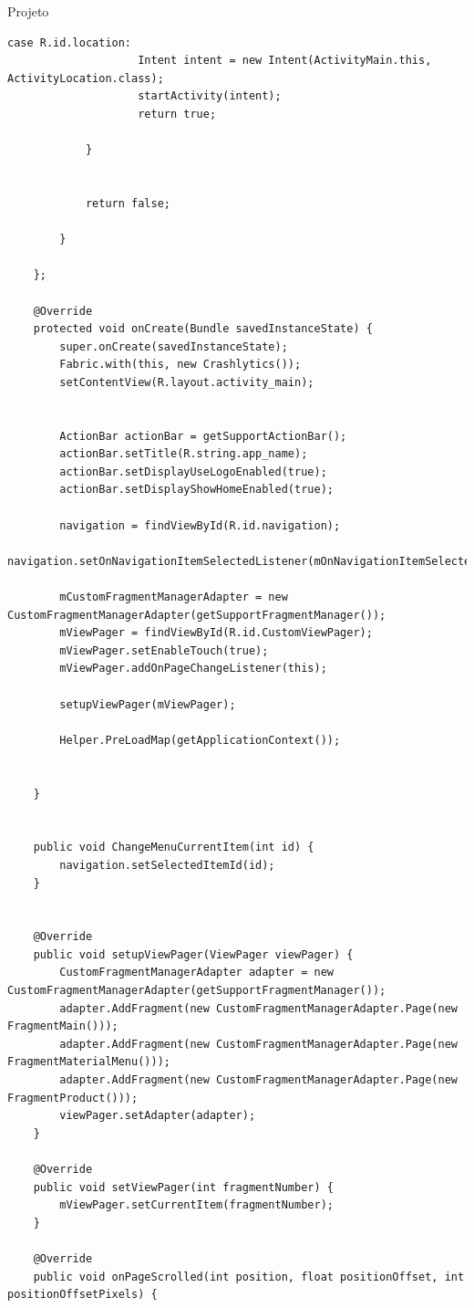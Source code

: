\documentclass[
	12pt,				%
	openright,			%
	twoside,			%
	a4paper,			%
	english,			%
	french,				%
	spanish,			%
	brazil				%
	]{abntex2}
\begin{document}
\begin{chapter}{Projeto}
\begin{lstlisting}[numbers=none,
basicstyle=\small,
caption={MainActivity.java},
title={MainActivity.java},
label={MainActivity.java}]
                case R.id.location:
                    Intent intent = new Intent(ActivityMain.this, ActivityLocation.class);
                    startActivity(intent);
                    return true;

            }


            return false;

        }

    };

    @Override
    protected void onCreate(Bundle savedInstanceState) {
        super.onCreate(savedInstanceState);
        Fabric.with(this, new Crashlytics());
        setContentView(R.layout.activity_main);


        ActionBar actionBar = getSupportActionBar();
        actionBar.setTitle(R.string.app_name);
        actionBar.setDisplayUseLogoEnabled(true);
        actionBar.setDisplayShowHomeEnabled(true);
      
        navigation = findViewById(R.id.navigation);
        navigation.setOnNavigationItemSelectedListener(mOnNavigationItemSelectedListener);

        mCustomFragmentManagerAdapter = new CustomFragmentManagerAdapter(getSupportFragmentManager());
        mViewPager = findViewById(R.id.CustomViewPager);
        mViewPager.setEnableTouch(true);
        mViewPager.addOnPageChangeListener(this);

        setupViewPager(mViewPager);

        Helper.PreLoadMap(getApplicationContext());


    }


    public void ChangeMenuCurrentItem(int id) {
        navigation.setSelectedItemId(id);
    }


    @Override
    public void setupViewPager(ViewPager viewPager) {
        CustomFragmentManagerAdapter adapter = new CustomFragmentManagerAdapter(getSupportFragmentManager());
        adapter.AddFragment(new CustomFragmentManagerAdapter.Page(new FragmentMain()));
        adapter.AddFragment(new CustomFragmentManagerAdapter.Page(new FragmentMaterialMenu()));
        adapter.AddFragment(new CustomFragmentManagerAdapter.Page(new FragmentProduct()));
        viewPager.setAdapter(adapter);
    }

    @Override
    public void setViewPager(int fragmentNumber) {
        mViewPager.setCurrentItem(fragmentNumber);
    }

    @Override
    public void onPageScrolled(int position, float positionOffset, int positionOffsetPixels) {



\end{lstlisting}
\end{chapter}
\end{document}
